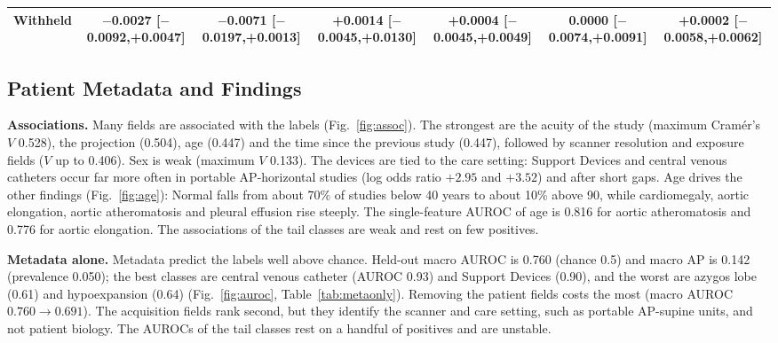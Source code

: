 \documentclass[conference]{IEEEtran}
\begin{document}
\begin{table}[htbp]
\begin{center}
\begin{tabular}{|l|c|c|c|c|c|c|}
Withheld & \shortstack{$-$0.0027\\{[$-$0.0092,+0.0047]}} & \shortstack{$-$0.0071\\{[$-$0.0197,+0.0013]}} & \shortstack{+0.0014\\{[$-$0.0045,+0.0130]}} & \shortstack{+0.0004\\{[$-$0.0045,+0.0049]}} & \shortstack{0.0000\\{[$-$0.0074,+0.0091]}} & \shortstack{+0.0002\\{[$-$0.0058,+0.0062]}} \\
\hline
\end{tabular}
\label{tab:hmm}
\end{center}
\end{table}

\subsection{Patient Metadata and Findings}
\label{sec:metaeda}
\textbf{Associations.} Many fields are associated with the labels (Fig.~\ref{fig:assoc}). The strongest are the acuity of the study (maximum Cram\'er's $V$ 0.528), the projection (0.504), age (0.447) and the time since the previous study (0.447), followed by scanner resolution and exposure fields ($V$ up to 0.406). Sex is weak (maximum $V$ 0.133). The devices are tied to the care setting: Support Devices and central venous catheters occur far more often in portable AP-horizontal studies (log odds ratio $+2.95$ and $+3.52$) and after short gaps. Age drives the other findings (Fig.~\ref{fig:age}): Normal falls from about 70\% of studies below 40 years to about 10\% above 90, while cardiomegaly, aortic elongation, aortic atheromatosis and pleural effusion rise steeply. The single-feature AUROC of age is 0.816 for aortic atheromatosis and 0.776 for aortic elongation. The associations of the tail classes are weak and rest on few positives.

\textbf{Metadata alone.} Metadata predict the labels well above chance. Held-out macro AUROC is 0.760 (chance 0.5) and macro AP is 0.142 (prevalence 0.050); the best classes are central venous catheter (AUROC 0.93) and Support Devices (0.90), and the worst are azygos lobe (0.61) and hypoexpansion (0.64) (Fig.~\ref{fig:auroc}, Table~\ref{tab:metaonly}). Removing the patient fields costs the most (macro AUROC $0.760 \to 0.691$). The acquisition fields rank second, but they identify the scanner and care setting, such as portable AP-supine units, and not patient biology. The AUROCs of the tail classes rest on a handful of positives and are unstable.
\end{document}
